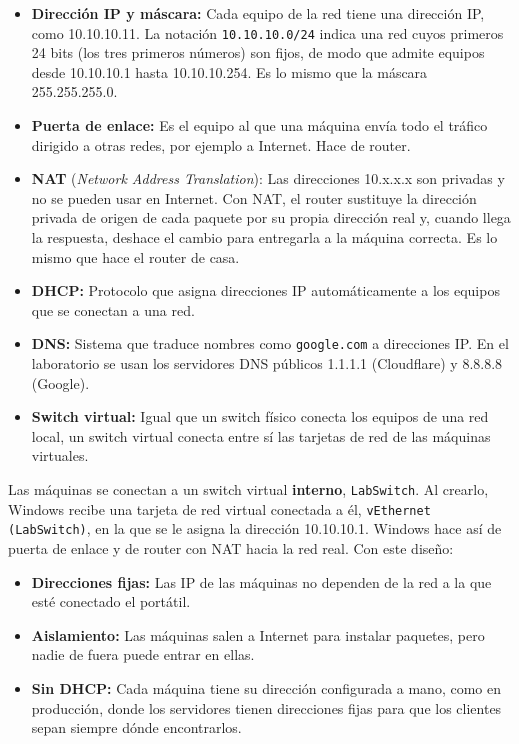 \documentclass[11pt, a4paper, titlepage]{article}
\newcommand{\cod}[1]{\texttt{#1}}
\begin{document}
\begin{itemize}
    \item \textbf{Dirección IP y máscara:} Cada equipo de la red tiene una dirección IP, como 10.10.10.11. La notación \cod{10.10.10.0/24} indica una red cuyos primeros 24 bits (los tres primeros números) son fijos, de modo que admite equipos desde 10.10.10.1 hasta 10.10.10.254. Es lo mismo que la máscara 255.255.255.0.
    \item \textbf{Puerta de enlace:} Es el equipo al que una máquina envía todo el tráfico dirigido a otras redes, por ejemplo a Internet. Hace de router.
    \item \textbf{NAT} (\textit{Network Address Translation}): Las direcciones 10.x.x.x son privadas y no se pueden usar en Internet. Con NAT, el router sustituye la dirección privada de origen de cada paquete por su propia dirección real y, cuando llega la respuesta, deshace el cambio para entregarla a la máquina correcta. Es lo mismo que hace el router de casa.
    \item \textbf{DHCP:} Protocolo que asigna direcciones IP automáticamente a los equipos que se conectan a una red.
    \item \textbf{DNS:} Sistema que traduce nombres como \cod{google.com} a direcciones IP. En el laboratorio se usan los servidores DNS públicos 1.1.1.1 (Cloudflare) y 8.8.8.8 (Google).
    \item \textbf{Switch virtual:} Igual que un switch físico conecta los equipos de una red local, un switch virtual conecta entre sí las tarjetas de red de las máquinas virtuales.
\end{itemize}

Las máquinas se conectan a un switch virtual \textbf{interno}, \cod{LabSwitch}. Al crearlo, Windows recibe una tarjeta de red virtual conectada a él, \cod{vEthernet (LabSwitch)}, en la que se le asigna la dirección 10.10.10.1. Windows hace así de puerta de enlace y de router con NAT hacia la red real. Con este diseño:

\begin{itemize}
    \item \textbf{Direcciones fijas:} Las IP de las máquinas no dependen de la red a la que esté conectado el portátil.
    \item \textbf{Aislamiento:} Las máquinas salen a Internet para instalar paquetes, pero nadie de fuera puede entrar en ellas.
    \item \textbf{Sin DHCP:} Cada máquina tiene su dirección configurada a mano, como en producción, donde los servidores tienen direcciones fijas para que los clientes sepan siempre dónde encontrarlos.
\end{itemize}
\end{document}
